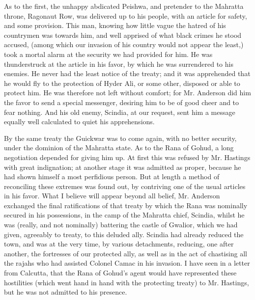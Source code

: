 As to the first, the unhappy abdicated Peishwa, and pretender to the Mahratta throne, Ragonaut Row, was delivered up to his people, with an article for safety, and some provision. This man, knowing how little vague the hatred of his countrymen was towards him, and well apprised of what black crimes he stood accused, (among which our invasion of his country would not appear the least,) took a mortal alarm at the security we had provided for him. He was thunderstruck at the article in his favor, by which he was surrendered to his enemies. He never had the least notice of the treaty; and it was apprehended that he would fly to the protection of Hyder Ali, or some other, disposed or able to protect him. He was therefore not left without comfort; for Mr. Anderson did him the favor to send a special messenger, desiring him to be of good cheer and to fear nothing. And his old enemy, Scindia, at our request, sent him a message equally well calculated to quiet his apprehensions.

By the same treaty the Guickwar was to come again, with no better security, under the dominion of the Mahratta state. As to the Rana of Gohud, a long negotiation depended for giving him up. At first this was refused by Mr. Hastings with great indignation; at another stage it was admitted as proper, because he had shown himself a most perfidious person. But at length a method of reconciling these extremes was found out, by contriving one of the usual articles in his favor. What I believe will appear beyond all belief, Mr. Anderson exchanged the final ratifications of that treaty by which the Rana was nominally secured in his possessions, in the camp of the Mahratta chief, Scindia, whilst he was (really, and not nominally) battering the castle of Gwalior, which we had given, agreeably to treaty, to this deluded ally. Scindia had already reduced the town, and was at the very time, by various detachments, reducing, one after another, the fortresses of our protected ally, as well as in the act of chastising all the rajahs who had assisted Colonel Camac in his invasion. I have seen in a letter from Calcutta, that the Rana of Gohud's agent would have represented these hostilities (which went hand in hand with the protecting treaty) to Mr. Hastings, but he was not admitted to his presence.

